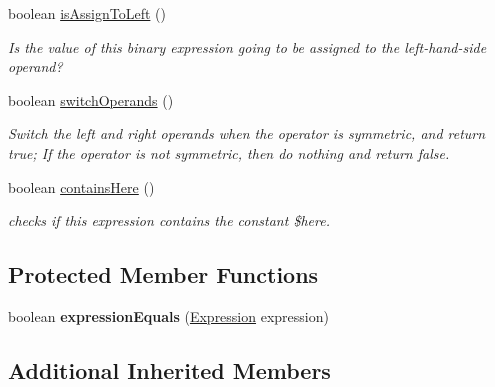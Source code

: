 \begin{DoxyCompactItemize}
\item 
boolean \hyperlink{classedu_1_1udel_1_1cis_1_1vsl_1_1civl_1_1model_1_1common_1_1expression_1_1CommonBinaryExpression_a34da73a8d4259a8c987cd0085e984ee1}{is\+Assign\+To\+Left} ()
\begin{DoxyCompactList}\small\item\em Is the value of this binary expression going to be assigned to the left-\/hand-\/side operand? \end{DoxyCompactList}\item 
boolean \hyperlink{classedu_1_1udel_1_1cis_1_1vsl_1_1civl_1_1model_1_1common_1_1expression_1_1CommonBinaryExpression_a603fabad63ad890d667ec4961f8d8235}{switch\+Operands} ()
\begin{DoxyCompactList}\small\item\em Switch the left and right operands when the operator is symmetric, and return true; If the operator is not symmetric, then do nothing and return false. \end{DoxyCompactList}\item 
boolean \hyperlink{classedu_1_1udel_1_1cis_1_1vsl_1_1civl_1_1model_1_1common_1_1expression_1_1CommonBinaryExpression_a148b560bd4b4e5e935ca3874357bf59c}{contains\+Here} ()
\begin{DoxyCompactList}\small\item\em checks if this expression contains the constant \$here. \end{DoxyCompactList}\end{DoxyCompactItemize}
\subsection*{Protected Member Functions}
\begin{DoxyCompactItemize}
\item 
\hypertarget{classedu_1_1udel_1_1cis_1_1vsl_1_1civl_1_1model_1_1common_1_1expression_1_1CommonBinaryExpression_ab411488566185582afdbd7f80e3b6a55}{}boolean {\bfseries expression\+Equals} (\hyperlink{interfaceedu_1_1udel_1_1cis_1_1vsl_1_1civl_1_1model_1_1IF_1_1expression_1_1Expression}{Expression} expression)\label{classedu_1_1udel_1_1cis_1_1vsl_1_1civl_1_1model_1_1common_1_1expression_1_1CommonBinaryExpression_ab411488566185582afdbd7f80e3b6a55}

\end{DoxyCompactItemize}
\subsection*{Additional Inherited Members}


